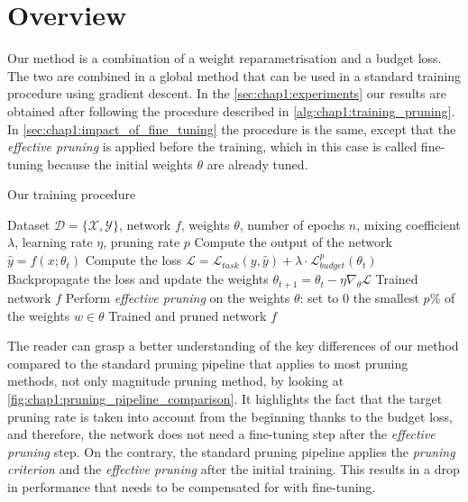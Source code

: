 
\section{Overview}
\label{sec:chap1:overview}
Our method is a combination of a weight reparametrisation and a budget loss. The
two are combined in a global method that can be used in a standard training
procedure using gradient descent. In the \cref{sec:chap1:experiments} our
results are obtained after following the procedure described in
\cref{alg:chap1:training_pruning}. In \cref{sec:chap1:impact_of_fine_tuning} the
procedure is the same, except that the \emph{effective pruning} is applied before the
training, which in this case is called fine-tuning because the initial weights
$\theta$ are already tuned.\\

\begin{algorithm}
  \caption{Our training procedure}
  \label{alg:chap1:training_pruning}
  \begin{algorithmic}
  \REQUIRE Dataset $\mathcal{D} = \{\mathcal{X}, \mathcal{Y}\}$, network $f$,
  weights $\theta$, number of epochs $n$, mixing coefficient $\lambda$, learning
  rate $\eta$, pruning rate $p$
          \STATE Compute the output of the network $\hat{y} = f(x; \theta_t)$
          \STATE Compute the loss $\mathcal{L}= \mathcal{L}_{task}(y, \hat{y}) + \lambda \cdot \mathcal{L}^{p}_{budget}(\theta_t)$
          \STATE Backpropagate the loss and update the weights $\theta_{t+1} = \theta_t - \eta \nabla_{\theta} \mathcal{L}$
      \ENDFOR
  \ENDFOR
  \RETURN Trained network $f$
  \STATE Perform \emph{effective pruning} on the weights $\theta$: set to 0 the
  smallest $p$\% of the weights $w\in\theta$
  \RETURN Trained and pruned network $f$
  \end{algorithmic}
  \end{algorithm}


The reader can grasp a better understanding of the key differences of our method
compared to the standard pruning pipeline that applies to most pruning methods,
not only magnitude pruning method, by looking at
\cref{fig:chap1:pruning_pipeline_comparison}. It highlights the fact that the
target pruning rate is taken into account from the beginning thanks to the
budget loss, and therefore, the network does not need a fine-tuning step after
the \emph{effective pruning} step. On the contrary, the standard pruning
pipeline applies the \emph{pruning criterion} and the \emph{effective pruning}
after the initial training. This results in a drop in performance that needs to
be compensated for with fine-tuning. \\

